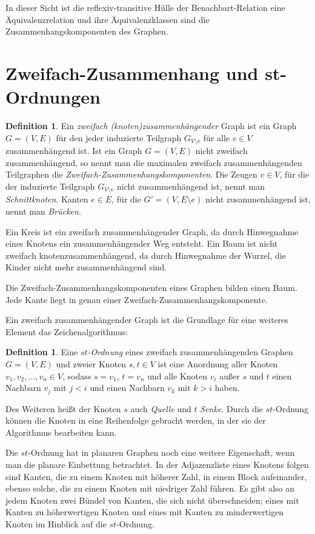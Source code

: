\documentclass[a4paper]{scrreprt}
\theoremstyle{definition}
\newtheorem{definition}[satz]{Definition}
\begin{document}
In dieser Sicht ist die reflexiv-transitive Hülle der Benachbart-Relation eine Äquivalenzrelation und ihre Äquivalenzklassen sind die Zusammenhangskomponenten des Graphen. %


\section{Zweifach-Zusammenhang und st-Ordnungen}

\begin{definition}
  Ein \emph{zweifach (knoten)zusammenhängender} Graph ist ein Graph $G=(V, E)$ für den jeder induzierte Teilgraph $G_{V \setminus v}$ für alle $v \in V$ zusammenhängend ist.
  Ist ein Graph $G=(V, E)$  nicht zweifach zusammenhängend, so nennt man die maximalen zweifach zusammenhängenden Teilgraphen die \emph{Zweifach-Zusammenhangskomponenten}. Die Zeugen $v \in V$, für die der induzierte Teilgraph $G_{V \setminus v}$ nicht zusammenhängend ist, nennt man \emph{Schnittknoten}. Kanten $e \in E$, für die $G' = (V, E \setminus e)$ nicht zusammenhängend ist, nennt man \emph{Brücken}.
\end{definition}

Ein Kreis ist ein zweifach zusammenhängender Graph, da durch Hinwegnahme eines Knotens ein zusammenhängender Weg entsteht. Ein Baum ist nicht zweifach knotenzusammenhängend, da durch Hinwegnahme der Wurzel, die Kinder nicht mehr zusammenhängend sind.

Die Zweifach-Zusammenhangskomponenten eines Graphen bilden einen Baum. Jede Kante liegt in genau einer Zweifach-Zusammenhangskomponente.

Ein zweifach zusammenhängender Graph ist die Grundlage für eine weiteres Element das Zeichenalgorithmus:

\begin{definition}
  Eine \emph{$st$-Ordnung} eines zweifach zusammenhängenden Graphen $G = (V, E)$ und zweier Knoten $s, t \in V$ ist eine Anordnung aller Knoten $v_1, v_2, \dots, v_n \in V$, sodass $s = v_1$, $t = v_n$ und alle Knoten $v_i$ außer $s$ und $t$  einen Nachbarn $v_j$ mit $j < i$ und einen Nachbarn $v_k$ mit $k > i$ haben.
\end{definition}

Des Weiteren heißt der Knoten $s$ auch \emph{Quelle} und $t$ \emph{Senke}. Durch die $st$-Ordnung können die Knoten in eine Reihenfolge gebracht werden, in der sie der Algorithmus bearbeiten kann.

Die $st$-Ordnung hat in planaren Graphen noch eine weitere Eigenschaft, wenn man die planare Einbettung betrachtet. In der Adjazenzliste eines Knotens folgen sind Kanten, die zu einem Knoten mit höherer Zahl, in einem Block aufeinander, ebenso solche, die zu einem Knoten mit niedriger Zahl führen. Es gibt also an jedem Knoten zwei Bündel von Kanten, die sich nicht überschneiden; eines mit Kanten zu höherwertigen Knoten und eines mit Kanten zu minderwertigen Knoten im Hinblick auf die $st$-Ordnung.
\end{document}
